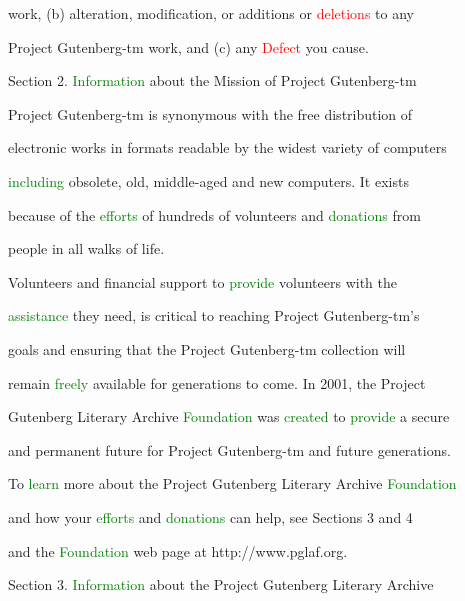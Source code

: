  work, (b) alteration, modification, or additions or \textcolor{red}{deletions} to any

 Project Gutenberg-tm work, and (c) any \textcolor{red}{Defect} you cause.





 Section 2. \textcolor{green}{Information} about the Mission of Project Gutenberg-tm



 Project Gutenberg-tm is \textcolor{BurntOrange}{synonymous} with the free distribution of

 electronic works in formats readable by the widest variety of computers

 \textcolor{green}{including} obsolete, old, middle-aged and new computers. It exists

 because of the \textcolor{green}{efforts} of hundreds of \textcolor{BurntOrange}{volunteers} and \textcolor{green}{donations} from

 people in all walks of life.



 \textcolor{BurntOrange}{Volunteers} and financial support to \textcolor{green}{provide} \textcolor{BurntOrange}{volunteers} with the

 \textcolor{green}{assistance} they need, is critical to reaching Project Gutenberg-tm’s

 goals and ensuring that the Project Gutenberg-tm collection will

 remain \textcolor{green}{freely} available for generations to come. In 2001, the Project

 Gutenberg Literary Archive \textcolor{green}{Foundation} was \textcolor{green}{created} to \textcolor{green}{provide} a secure

 and permanent future for Project Gutenberg-tm and future generations.

 To \textcolor{green}{learn} more about the Project Gutenberg Literary Archive \textcolor{green}{Foundation}

 and how your \textcolor{green}{efforts} and \textcolor{green}{donations} can help, see Sections 3 and 4

 and the \textcolor{green}{Foundation} web page at http://www.pglaf.org.





 Section 3. \textcolor{green}{Information} about the Project Gutenberg Literary Archive

